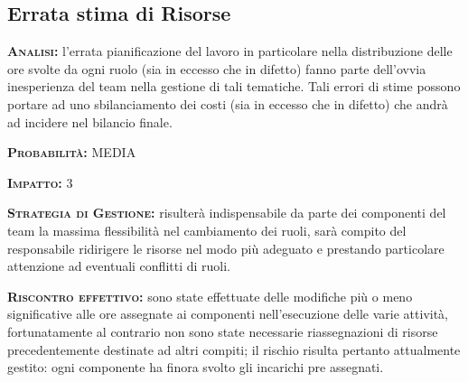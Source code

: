 \subsection{Errata stima di Risorse}
\begin{description}
	\item{\scshape\bfseries Analisi:} l'errata pianificazione del lavoro in particolare nella distribuzione delle ore svolte da ogni ruolo (sia in eccesso che in difetto) fanno parte dell'ovvia inesperienza del team nella gestione di tali tematiche. Tali errori di stime possono portare ad uno sbilanciamento dei costi (sia in eccesso che in difetto) che andrà ad incidere nel bilancio finale.
	\item{\scshape\bfseries Probabilità:} MEDIA
	\item{\scshape\bfseries Impatto:} 3
	\item{\scshape\bfseries Strategia di Gestione:} risulterà indispensabile da parte dei componenti del team la massima flessibilità nel cambiamento dei ruoli, sarà compito del responsabile ridirigere le risorse nel modo più adeguato e prestando particolare attenzione ad eventuali conflitti di ruoli.
	\item{\scshape\bfseries Riscontro effettivo:} sono state effettuate delle modifiche più o meno significative alle ore assegnate ai componenti nell'esecuzione delle varie attività, fortunatamente al contrario non sono state necessarie riassegnazioni di risorse precedentemente destinate ad altri compiti; il rischio risulta pertanto attualmente gestito: ogni componente ha finora svolto gli incarichi pre assegnati.
\end{description}

